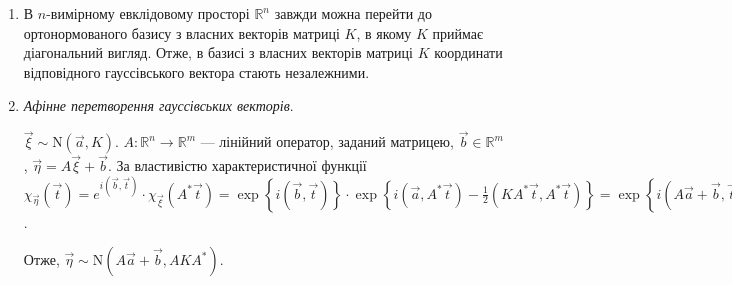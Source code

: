 \begin{enumerate}
\begin{proof}
        Якщо координати некорельовані, то кореляційна матриця $K = \mathrm{diag}(\sigma_1^2, \sigma_2^2, ..., \sigma_n^2)$.
        Тоді $\left( K \vec{t}, \vec{t}\right) = \sum_{k=1}^n \sigma_k^2 t_k^2$.
        Тоді $\chi_{\vec{\xi}}(\vec{t}) = \exp\left\{i(\vec{a}, \vec{t}) - \frac{1}{2}\left( K \vec{t}, \vec{t}\right)\right\} = \prod\limits_{k=1}^n e^{i a_k t_k - \frac{1}{2}\sigma_k^2 t_k^2} = \prod\limits_{k=1}^n \chi_{\xi_k}(t_k)$
        і координати незалежні.
    \end{proof}
    \item В $n$-вимірному евклідовому просторі $\mathbb{R}^n$ завжди можна перейти до
    ортонормованого базису з власних векторів матриці $K$, в якому $K$ приймає діагональний вигляд.
    Отже, в базисі з власних векторів матриці $K$ координати відповідного гауссівського вектора стають незалежними.
    \item \emph{Афінне перетворення гауссівських векторів}.

    $\vec{\xi} \sim \mathrm{N}(\vec{a}, K)$. $A : \mathbb{R}^n \rightarrow \mathbb{R}^m$ --- лінійний оператор, заданий матрицею, $\vec{b} \in \mathbb{R}^m$, $\vec{\eta} = A\vec{\xi} + \vec{b}$.
    За властивістю характеристичної функції $\chi_{\vec{\eta}}(\vec{t}) = e^{i(\vec{b}, \vec{t})}\cdot\chi_{\vec{\xi}}(A^{*}\vec{t}) =
    \exp\left\{i(\vec{b}, \vec{t})\right\}\cdot \exp\left\{i(\vec{a}, A^{*}\vec{t}) - \frac{1}{2}\left( K A^{*}\vec{t}, A^{*}\vec{t}\right)\right\} =
    \exp\left\{i(A\vec{a} + \vec{b}, \vec{t}) - \frac{1}{2}\left( A K A^{*}\vec{t}, \vec{t}\right)\right\}$. 
    
    Отже, $\vec{\eta} \sim \mathrm{N}(A\vec{a} + \vec{b}, A K A^{*})$.
\end{enumerate}
